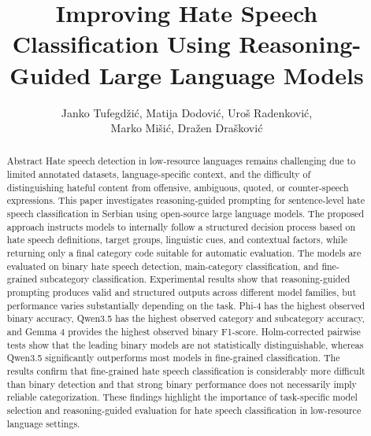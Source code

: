\documentclass[a4paper]{article}
\begin{document}
\title{Improving Hate Speech Classification Using Reasoning-Guided Large Language Models}

\author{
Janko Tufegdžić, Matija Dodović, Uroš Radenković,\\
Marko Mišić, Dražen Drašković
}



\maketitle


\begin{abstract}{Abstract}
Hate speech detection in low-resource languages remains challenging due to limited annotated datasets, language-specific context, and the difficulty of distinguishing hateful content from offensive, ambiguous, quoted, or counter-speech expressions. This paper investigates reasoning-guided prompting for sentence-level hate speech classification in Serbian using open-source large language models. The proposed approach instructs models to internally follow a structured decision process based on hate speech definitions, target groups, linguistic cues, and contextual factors, while returning only a final category code suitable for automatic evaluation. The models are evaluated on binary hate speech detection, main-category classification, and fine-grained subcategory classification. Experimental results show that reasoning-guided prompting produces valid and structured outputs across different model families, but performance varies substantially depending on the task. Phi-4 has the highest observed binary accuracy, Qwen3.5 has the highest observed category and subcategory accuracy, and Gemma 4 provides the highest observed binary F1-score. Holm-corrected pairwise tests show that the leading binary models are not statistically distinguishable, whereas Qwen3.5 significantly outperforms most models in fine-grained classification. The results confirm that fine-grained hate speech classification is considerably more difficult than binary detection and that strong binary performance does not necessarily imply reliable categorization. These findings highlight the importance of task-specific model selection and reasoning-guided evaluation for hate speech classification in low-resource language settings.
\end{abstract}
\end{document}
